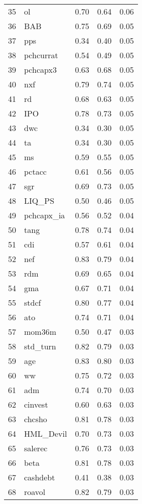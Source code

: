 \documentclass[12pt]{article}
\begin{document}
\begin{footnotesize}
\begin{longtable}{rl|c|c|c}
		35 & ol & 0.70 & 0.64 & 0.06 \\ 
		36 & BAB & 0.75 & 0.69 & 0.05 \\ 
		37 & pps & 0.34 & 0.40 & 0.05 \\ 
		38 & pchcurrat & 0.54 & 0.49 & 0.05 \\ 
		39 & pchcapx3 & 0.63 & 0.68 & 0.05 \\ 
		40 & nxf & 0.79 & 0.74 & 0.05 \\ 
		41 & rd & 0.68 & 0.63 & 0.05 \\ 
		42 & IPO & 0.78 & 0.73 & 0.05 \\ 
		43 & dwc & 0.34 & 0.30 & 0.05 \\ 
		44 & ta & 0.34 & 0.30 & 0.05 \\ 
		45 & ms & 0.59 & 0.55 & 0.05 \\ 
		46 & pctacc & 0.61 & 0.56 & 0.05 \\ 
		47 & sgr & 0.69 & 0.73 & 0.05 \\ 
		48 & LIQ\_PS & 0.50 & 0.46 & 0.05 \\ 
		49 & pchcapx\_ia & 0.56 & 0.52 & 0.04 \\ 
		50 & tang & 0.78 & 0.74 & 0.04 \\ 
		51 & cdi & 0.57 & 0.61 & 0.04 \\ 
		52 & nef & 0.83 & 0.79 & 0.04 \\ 
		53 & rdm & 0.69 & 0.65 & 0.04 \\ 
		54 & gma & 0.67 & 0.71 & 0.04 \\ 
		55 & stdcf & 0.80 & 0.77 & 0.04 \\ 
		56 & ato & 0.74 & 0.71 & 0.04 \\ 
		57 & mom36m & 0.50 & 0.47 & 0.03 \\ 
		58 & std\_turn & 0.82 & 0.79 & 0.03 \\ 
		59 & age & 0.83 & 0.80 & 0.03 \\ 
		60 & ww & 0.75 & 0.72 & 0.03 \\ 
		61 & adm & 0.74 & 0.70 & 0.03 \\ 
		62 & cinvest & 0.60 & 0.63 & 0.03 \\ 
		63 & chcsho & 0.81 & 0.78 & 0.03 \\ 
		64 & HML\_Devil & 0.70 & 0.73 & 0.03 \\ 
		65 & salerec & 0.76 & 0.73 & 0.03 \\ 
		66 & beta & 0.81 & 0.78 & 0.03 \\ 
		67 & cashdebt & 0.41 & 0.38 & 0.03 \\ 
		68 & roavol & 0.82 & 0.79 & 0.03 \\ 

\end{longtable}
\end{footnotesize}
\end{document}
